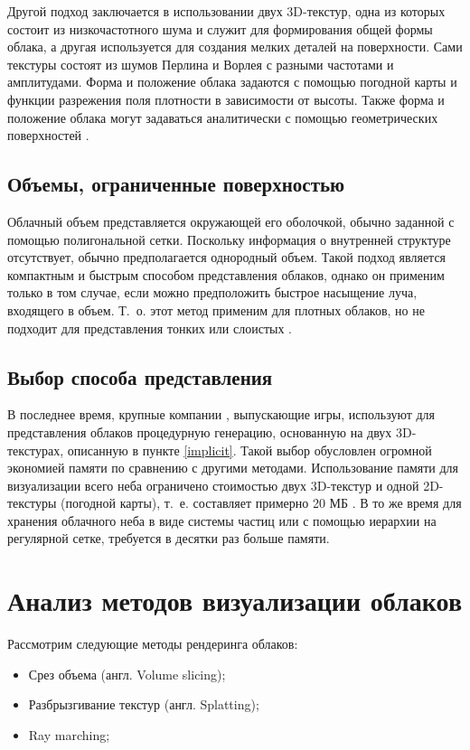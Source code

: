 Другой подход заключается в использовании двух 3D-текстур, одна из которых состоит из низкочастотного шума и служит для формирования общей формы облака, а другая используется для создания мелких деталей на поверхности. Сами текстуры состоят из шумов Перлина и Ворлея с разными частотами и амплитудами. Форма и положение облака задаются с помощью погодной карты и функции разрежения поля плотности в зависимости от высоты. Также форма и положение облака могут задаваться аналитически с помощью геометрических поверхностей \cite{frostbite, hzd}.

\subsection{Объемы, ограниченные поверхностью} 
Облачный объем представляется окружающей его оболочкой, обычно заданной с помощью полигональной сетки. Поскольку информация о внутренней структуре отсутствует, обычно предполагается однородный объем. Такой подход является компактным и быстрым способом представления облаков, однако он применим только в том случае, если можно предположить быстрое насыщение луча, входящего в объем. Т.~о. этот метод применим для плотных облаков, но не подходит для представления тонких или слоистых \cite{clouds}. 

\subsection{Выбор способа представления}

В последнее время, крупные компании \cite{frostbite, hzd}, выпускающие игры, используют для представления облаков процедурную генерацию, основанную на двух 3D-текстурах, описанную в пункте \ref{implicit}. Такой выбор обусловлен огромной экономией памяти по сравнению с другими методами. Использование памяти для визуализации всего неба ограничено стоимостью двух 3D-текстур и одной 2D-текстуры (погодной карты), т.~е. составляет примерно 20 МБ \cite{hzdres}. В то же время для хранения облачного неба в виде системы частиц или с помощью иерархии на регулярной сетке, требуется в десятки раз больше памяти.

 
\section{Анализ методов визуализации облаков}

Рассмотрим следующие методы рендеринга облаков:

\begin{itemize}
	\item Срез объема (англ. Volume slicing);
	\item Разбрызгивание текстур (англ. Splatting);
	\item Ray marching;
\end{itemize}


